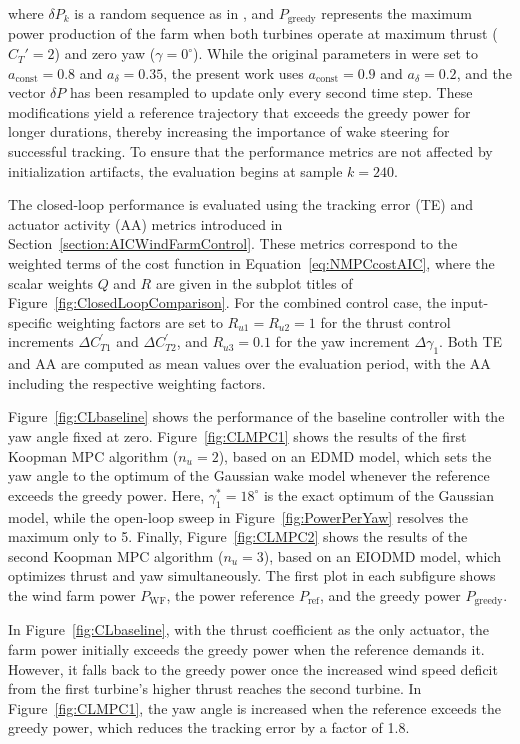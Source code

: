 where $\delta P_k$ is a random sequence as in \cite{sharan2022Koopman}, and $P_{\text{greedy}}$ represents the maximum power production of the farm when both turbines operate at maximum thrust ($C_T' = 2$) and zero yaw ($\gamma = 0^\circ$). While the original parameters in \cite{sharan2022Koopman} were set to $a_{\text{const}} = 0.8$ and $a_{\delta} = 0.35$, the present work uses $a_{\text{const}} = 0.9$ and $a_{\delta} = 0.2$, and the vector $\delta P$ has been resampled to update only every second time step. These modifications yield a reference trajectory that exceeds the greedy power for longer durations, thereby increasing the importance of wake steering for successful tracking. To ensure that the performance metrics are not affected by initialization artifacts, the evaluation begins at sample $k=240$.

The closed-loop performance is evaluated using the tracking error (TE) and actuator activity (AA) metrics introduced in Section~\ref{section:AICWindFarmControl}. These metrics correspond to the weighted terms of the cost function in Equation~\eqref{eq:NMPCcostAIC}, where the scalar weights $Q$ and $R$ are given in the subplot titles of Figure~\ref{fig:ClosedLoopComparison}. For the combined control case, the input-specific weighting factors are set to $R_{u1} = R_{u2} = 1$ for the thrust control increments $\Delta C_{T1}^\prime$ and $\Delta C_{T2}^\prime$, and $R_{u3} = 0.1$ for the yaw increment $\Delta \gamma_1$. Both TE and AA are computed as mean values over the evaluation period, with the AA including the respective weighting factors.

Figure~\ref{fig:CLbaseline} shows the performance of the baseline controller with the yaw angle fixed at zero. Figure~\ref{fig:CLMPC1} shows the results of the first Koopman MPC algorithm ($n_u=2$), based on an EDMD model, which sets the yaw angle to the optimum of the Gaussian wake model whenever the reference exceeds the greedy power. Here, $\gamma_1^* = 18^\circ$ is the exact optimum of the Gaussian model, while the open-loop sweep in Figure~\ref{fig:PowerPerYaw} resolves the maximum only to 5\textdegree{}. Finally, Figure~\ref{fig:CLMPC2} shows the results of the second Koopman MPC algorithm ($n_u=3$), based on an EIODMD model, which optimizes thrust and yaw simultaneously. The first plot in each subfigure shows the wind farm power $P_{\text{WF}}$, the power reference $P_{\text{ref}}$, and the greedy power $P_{\text{greedy}}$.

In Figure~\ref{fig:CLbaseline}, with the thrust coefficient as the only actuator, the farm power initially exceeds the greedy power when the reference demands it. However, it falls back to the greedy power once the increased wind speed deficit from the first turbine's higher thrust reaches the second turbine. In Figure~\ref{fig:CLMPC1}, the yaw angle is increased when the reference exceeds the greedy power, which reduces the tracking error by a factor of 1.8.

